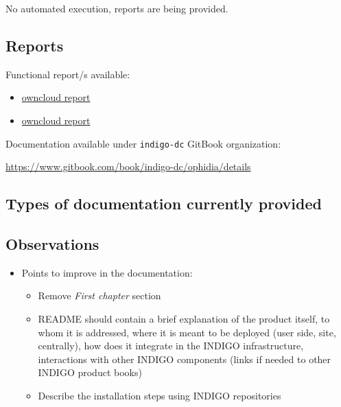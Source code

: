\documentclass[a4wide,11pt]{article}
\begin{document}

\label{sec:func_int_test}

No automated execution, reports are being provided.


\subsection{Reports}
Functional report/s available:
\begin{itemize}
        \item \href{https://owncloud.indigo-datacloud.eu/index.php/apps/files/ajax/download.php?dir=%2FINDIGO-DC%20testing%20reports%2Ffunctional%2Findigo_1%2FOphidia&files=Test.doc}{owncloud report}
        \item \href{https://owncloud.indigo-datacloud.eu/index.php/apps/files/ajax/download.php?dir=%2FINDIGO-DC%20testing%20reports%2Ffunctional%2Findigo_1%2FOphidia&files=Workflows.zip}{owncloud report}
    \end{itemize}




\label{sec:gitbook}
Documentation available under \texttt{indigo-dc} GitBook organization: \vspace{0.1em} \begin{center}\url{https://www.gitbook.com/book/indigo-dc/ophidia/details}\end{center} 
\subsection{Types of documentation currently provided}
\begin{center}
\end{center}
\subsection{Observations}
\begin{itemize}
        \item Points to improve in the documentation: \begin{itemize} \item Remove \textit{First chapter} section \item README should contain a brief explanation of the product itself, to whom it is addressed, where it is meant to be deployed (user side, site, centrally), how does it integrate in the INDIGO infrastructure, interactions with other INDIGO components (links if needed to other INDIGO product books) \item Describe the installation steps using INDIGO repositories \end{itemize}
    \end{itemize}
\end{document}
